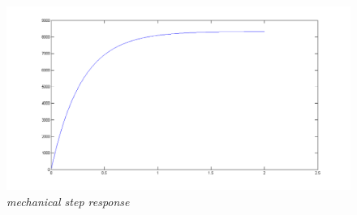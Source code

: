 \documentclass[12pt,a4paper]{article}
\begin{document}
\begin{figure}[h!]
\centering
  \includegraphics[width=1\linewidth]{mechanicalsim.png}
  \caption{\emph{mechanical step response}}
  \label{fig:mechanical}
\end{figure}
\end{document}
